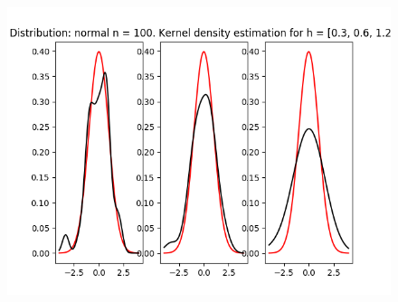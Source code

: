 \documentclass[12pt]{report}
\begin{document}
\begin{center}
\begin{figure}[H]
\includegraphics[width=\textwidth]{../lab_4/pic/kernel/d_normal100.png}
\end{figure}


\end{center}
\end{document}
